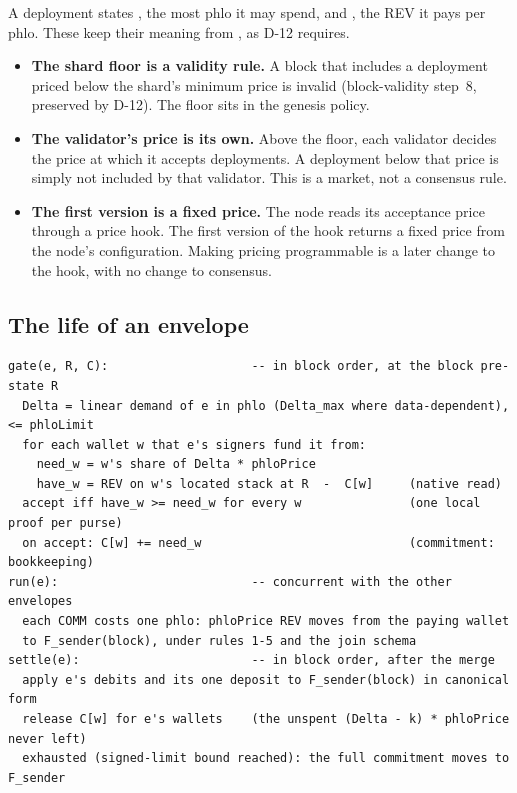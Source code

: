 \documentclass[11pt]{article}
\newcommand{\code}{\path}
\begin{document}
A deployment states \code{phloLimit}, the most phlo it may spend, and \code{phloPrice}, the REV it pays per phlo. These keep their meaning from \code{dev}, as D-12 requires.
\begin{itemize}
\item \textbf{The shard floor is a validity rule.} A block that includes a deployment priced below the shard's minimum price is invalid (block-validity step~8, preserved by D-12). The floor sits in the genesis policy.
\item \textbf{The validator's price is its own.} Above the floor, each validator decides the price at which it accepts deployments. A deployment below that price is simply not included by that validator. This is a market, not a consensus rule.
\item \textbf{The first version is a fixed price.} The node reads its acceptance price through a price hook. The first version of the hook returns a fixed price from the node's configuration. Making pricing programmable is a later change to the hook, with no change to consensus.
\end{itemize}

\subsection{The life of an envelope}

\begin{Verbatim}[fontsize=\footnotesize,frame=single,framesep=6pt]
gate(e, R, C):                    -- in block order, at the block pre-state R
  Delta = linear demand of e in phlo (Delta_max where data-dependent), <= phloLimit
  for each wallet w that e's signers fund it from:
    need_w = w's share of Delta * phloPrice
    have_w = REV on w's located stack at R  -  C[w]     (native read)
  accept iff have_w >= need_w for every w               (one local proof per purse)
  on accept: C[w] += need_w                             (commitment: bookkeeping)
run(e):                           -- concurrent with the other envelopes
  each COMM costs one phlo: phloPrice REV moves from the paying wallet
  to F_sender(block), under rules 1-5 and the join schema
settle(e):                        -- in block order, after the merge
  apply e's debits and its one deposit to F_sender(block) in canonical form
  release C[w] for e's wallets    (the unspent (Delta - k) * phloPrice never left)
  exhausted (signed-limit bound reached): the full commitment moves to F_sender
\end{Verbatim}
\end{document}
